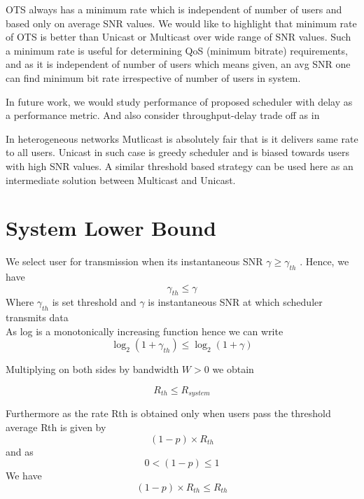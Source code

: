 \documentclass[conference]{IEEEtran}
\begin{document}
OTS always has a minimum rate which is independent of number of users and based only on average SNR values. We would like to highlight that minimum rate of OTS is better than Unicast or Multicast over wide range of SNR values. Such a minimum rate is useful for determining QoS (minimum bitrate) requirements, and as it is independent of number of users which means given, an avg SNR one can find minimum bit rate irrespective of number of users in system.

In future work, we would study performance of proposed scheduler with delay as a performance metric. And also consider throughput-delay trade off as in \cite{Praveenkumar_throuputdelay}

In heterogeneous networks Mutlicast is absolutely fair that is it delivers same rate to all users. Unicast in such case is greedy scheduler and is biased towards users with high SNR values.  A similar threshold based strategy can be used here as an intermediate solution between Multicast and Unicast.




\nocite{OMS}
\appendix

\section{System Lower Bound}
\label{Appendix: lower bound}
We select user for transmission when its instantaneous SNR $\gamma \ge {{\gamma }_{th}}$ .
Hence, we have 
\[{{\gamma }_{th}}\le \gamma \]
Where  ${{\gamma }_{th}}$ is set threshold and $\gamma $   is instantaneous SNR at which scheduler transmits data\\
As log is a monotonically increasing function hence we can write 
\begin{equation} \label{equ:logth le loggamma}
{{\log }_{2}}\left( 1+{{\gamma }_{th}} \right)\le {{\log }_{2}}\left( 1+\gamma  \right)
\end{equation}

Multiplying on both sides by bandwidth $W>0$ we obtain

\begin{equation} \label{equ:rth le rsys}
{{R}_{th}}\le {{R}_{system}}
\end{equation}

Furthermore as the rate Rth is obtained only when users pass the threshold average Rth is given by 
\[\left( 1-p \right)\times {{R}_{th}}\] and as 
\[0<\left( 1-p \right)\le 1\]
We have
\begin{equation} \label{equ:rth 1-p  le rsys}
\left( 1-p \right)\times {{R}_{th}}\le {{R}_{th}} 
\end{equation}
 
\end{document}
